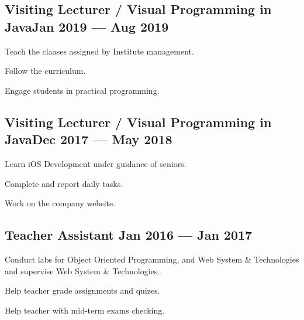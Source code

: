 \documentclass[letter,10pt]{article}
\begin{document}
\subsection{{Visiting Lecturer / Visual Programming in Java\hfill Jan 2019 --- Aug 2019}}
\begin{zitemize}
\item Teach the claases assigned by Institute management.
\item Follow the curriculum.
\item Engage students in practical programming.
\end{zitemize}

\subsection{{Visiting Lecturer / Visual Programming in Java\hfill Dec 2017 --- May 2018}}
\begin{zitemize}
\item Learn iOS Development under guidance of seniors.
\item Complete and report daily tasks.
\item Work on the company website.
\end{zitemize}

\subsection{{Teacher Assistant \hfill Jan 2016 --- Jan 2017}}
\begin{zitemize}
\item Conduct labs for Object Oriented Programming, and Web System \& Technologies and supervise Web System \& Technologies..
\item Help teacher grade assignments and quizes.
\item Help teacher with mid-term exams checking.
\end{zitemize}
\end{document}
